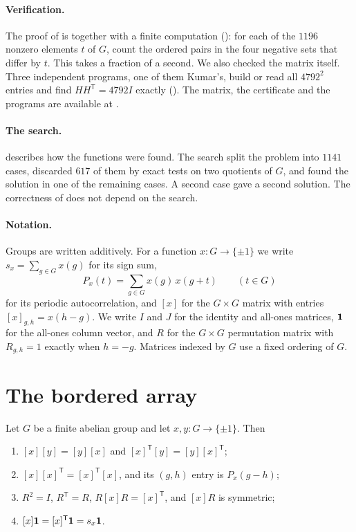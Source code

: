 \documentclass[11pt,colorlinks]{charlie}
\newcommand{\T}{\mathsf T}
\newcommand{\dev}[1]{[#1]}
\begin{document}
\paragraph{Verification.}
The proof of  is  together with a finite computation (): for each of the $1196$ nonzero elements $t$ of $G$, count the ordered pairs in the four negative sets that differ by $t$. This takes a fraction of a second. We also checked the matrix itself. Three independent programs, one of them Kumar's, build or read all $4792^2$ entries and find $HH^{\T}=4792I$ exactly (). The matrix, the certificate and the programs are available at \coderepo.

\paragraph{The search.}
 describes how the functions were found. The search split the problem into $1141$ cases, discarded $617$ of them by exact tests on two quotients of $G$, and found the solution in one of the remaining cases. A second case gave a second solution. The correctness of  does not depend on the search.

\paragraph{Notation.}
Groups are written additively. For a function $x\colon G\to\{\pm1\}$ we write $s_x=\sum_{g\in G}x(g)$ for its sign sum,
\[
P_x(t)=\sum_{g\in G}x(g)\,x(g+t)\qquad(t\in G)
\]
for its periodic autocorrelation, and $\dev x$ for the $G\times G$ matrix with entries $\dev x_{g,h}=x(h-g)$. We write $I$ and $J$ for the identity and all-ones matrices, $\mathbf{1}$ for the all-ones column vector, and $R$ for the $G\times G$ permutation matrix with $R_{g,h}=1$ exactly when $h=-g$. Matrices indexed by $G$ use a fixed ordering of $G$.

\section{The bordered array}\label{sec:array}

\begin{lemma}\label{lem:developed}
Let $G$ be a finite abelian group and let $x,y\colon G\to\{\pm1\}$. Then
\begin{enumerate}
\item\label{it:commute} $\dev x\dev y=\dev y\dev x$ and $\dev x^{\T}\dev y=\dev y\dev x^{\T}$;
\item\label{it:gram} $\dev x\dev x^{\T}=\dev x^{\T}\dev x$, and its $(g,h)$ entry is $P_x(g-h)$;
\item\label{it:reflect} $R^2=I$, $R^{\T}=R$, $R\dev xR=\dev x^{\T}$, and $\dev xR$ is symmetric;
\item\label{it:rowsum} $\dev x\one=\dev x^{\T}\one=s_x\one$.
\end{enumerate}
\end{lemma}
\end{document}
